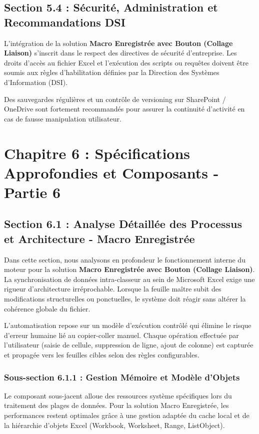 \documentclass[12pt,a4paper]{report}
\begin{document}
\section{Section 5.4 : Sécurité, Administration et Recommandations DSI}
L'intégration de la solution \textbf{Macro Enregistrée avec Bouton (Collage Liaison)} s'inscrit dans le respect des directives de sécurité d'entreprise. Les droits d'accès au fichier Excel et l'exécution des scripts ou requêtes doivent être soumis aux règles d'habilitation définies par la Direction des Systèmes d'Information (DSI).

Des sauvegardes régulières et un contrôle de versioning sur SharePoint / OneDrive sont fortement recommandés pour assurer la continuité d'activité en cas de fausse manipulation utilisateur.


\chapter{Chapitre 6 : Spécifications Approfondies et Composants - Partie 6}

\section{Section 6.1 : Analyse Détaillée des Processus et Architecture - Macro Enregistrée}
Dans cette section, nous analysons en profondeur le fonctionnement interne du moteur pour la solution \textbf{Macro Enregistrée avec Bouton (Collage Liaison)}. La synchronisation de données intra-classeur au sein de Microsoft Excel exige une rigueur d'architecture irréprochable. Lorsque la feuille maître subit des modifications structurelles ou ponctuelles, le système doit réagir sans altérer la cohérence globale du fichier.

L'automatisation repose sur un modèle d'exécution contrôlé qui élimine le risque d'erreur humaine lié au copier-coller manuel. Chaque opération effectuée par l'utilisateur (saisie de cellule, suppression de ligne, ajout de colonne) est capturée et propagée vers les feuilles cibles selon des règles configurables.


\subsection{Sous-section 6.1.1 : Gestion Mémoire et Modèle d'Objets}
Le composant sous-jacent alloue des ressources système spécifiques lors du traitement des plages de données. Pour la solution Macro Enregistrée, les performances restent optimales grâce à une gestion adaptée du cache local et de la hiérarchie d'objets Excel (Workbook, Worksheet, Range, ListObject).
\end{document}
